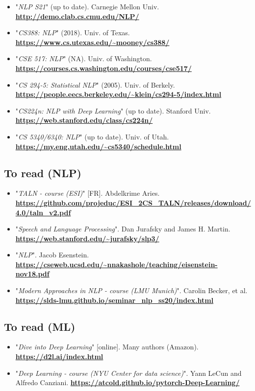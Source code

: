 \documentclass[11pt, a4paper]{article}
\newcommand{\kurl}[1]{{\scriptsize\bfseries\url{#1}}}
\begin{document}
\begin{itemize}
	\item "\textit{NLP S21}" (up to date).
	Carnegie Mellon Univ. 
	\kurl{http://demo.clab.cs.cmu.edu/NLP/}
	
	\item "\textit{CS388: NLP}" (2018). 
	Univ. of Texas. 
	\kurl{https://www.cs.utexas.edu/~mooney/cs388/}
	
	\item "\textit{CSE 517: NLP}" (NA).
	Univ. of Washington.
	\kurl{https://courses.cs.washington.edu/courses/cse517/}
	
	\item "\textit{CS 294-5: Statistical NLP}" (2005). 
	Univ. of Berkely. 
	\kurl{https://people.eecs.berkeley.edu/~klein/cs294-5/index.html}
	
	\item "\textit{CS224n: NLP with Deep Learning}" (up to date).
	Stanford Univ.
	\kurl{https://web.stanford.edu/class/cs224n/}
	
	\item "\textit{CS 5340/6340: NLP}" (up to date). 
	Univ. of Utah.
	\kurl{https://my.eng.utah.edu/~cs5340/schedule.html}
\end{itemize}

\subsection{To read (NLP)}

\begin{itemize}
	\item "\textit{TALN - course (ESI)}" [FR].
	Abdelkrime Aries. 
	\kurl{https://github.com/projeduc/ESI_2CS_TALN/releases/download/4.0/taln_v2.pdf}
	
	
	\item "\textit{Speech and Language Processing}".
	Dan Jurafsky and James H. Martin.
	\kurl{https://web.stanford.edu/~jurafsky/slp3/}
	
	\item "\textit{NLP}".
	Jacob Esenstein.
	\kurl{https://cseweb.ucsd.edu/~nnakashole/teaching/eisenstein-nov18.pdf}
	
	\item "\textit{Modern Approaches in NLP - course (LMU Munich)}".
	Carolin Becker, et al.
	\kurl{https://slds-lmu.github.io/seminar_nlp_ss20/index.html}
\end{itemize}

\subsection{To read (ML)}

\begin{itemize}
	\item "\textit{Dive into Deep Learning}" [online].
	Many authors (Amazon).
	\kurl{https://d2l.ai/index.html}
	
	\item "\textit{Deep Learning - course (NYU Center for data science)}".
	Yann LeCun and Alfredo Canziani.
	\kurl{https://atcold.github.io/pytorch-Deep-Learning/}
\end{itemize}
\end{document}

